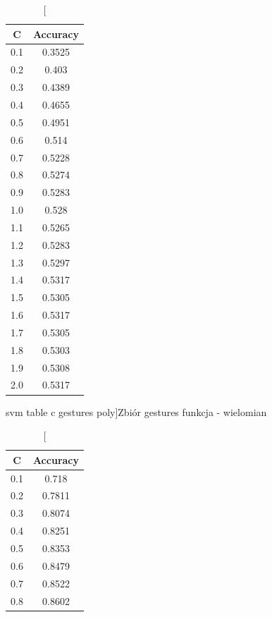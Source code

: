 \documentclass{classrep}
\begin{document}
{{%

\begin{table}[!htbp]
    \begin{minipage}{.35\textwidth}
        \centering
        \begin{tabular}{|c|c|}
            \hline
			C & Accuracy \\ \hline
			0.1 & 0.3525 \\ \hline
0.2 & 0.403 \\ \hline
0.3 & 0.4389 \\ \hline
0.4 & 0.4655 \\ \hline
0.5 & 0.4951 \\ \hline
0.6 & 0.514 \\ \hline
0.7 & 0.5228 \\ \hline
0.8 & 0.5274 \\ \hline
0.9 & 0.5283 \\ \hline
1.0 & 0.528 \\ \hline
1.1 & 0.5265 \\ \hline
1.2 & 0.5283 \\ \hline
1.3 & 0.5297 \\ \hline
1.4 & 0.5317 \\ \hline
1.5 & 0.5305 \\ \hline
1.6 & 0.5317 \\ \hline
1.7 & 0.5305 \\ \hline
1.8 & 0.5303 \\ \hline
1.9 & 0.5308 \\ \hline
2.0 & 0.5317 \\ \hline
        \end{tabular}
        \caption
        [svm table c gestures poly]{Zbiór gestures funkcja - wielomian}
		\label{svm_table_c_gestures_poly}
    \end{minipage}
    \hfill
    \begin{minipage}{.3\textwidth}
        \centering
        \begin{tabular}{|c|c|}
            \hline
			C & Accuracy \\ \hline
			0.1 & 0.718 \\ \hline
0.2 & 0.7811 \\ \hline
0.3 & 0.8074 \\ \hline
0.4 & 0.8251 \\ \hline
0.5 & 0.8353 \\ \hline
0.6 & 0.8479 \\ \hline
0.7 & 0.8522 \\ \hline
0.8 & 0.8602 \\ \hline

\end{tabular}
\end{minipage}
\end{table}}}
\end{document}
